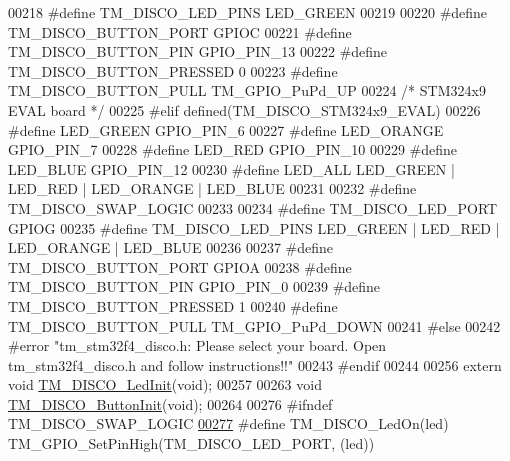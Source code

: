 \begin{DoxyCode}
00218 \textcolor{preprocessor}{    #define TM\_DISCO\_LED\_PINS           LED\_GREEN}
00219 
00220 \textcolor{preprocessor}{    #define TM\_DISCO\_BUTTON\_PORT        GPIOC}
00221 \textcolor{preprocessor}{    #define TM\_DISCO\_BUTTON\_PIN         GPIO\_PIN\_13}
00222 \textcolor{preprocessor}{    #define TM\_DISCO\_BUTTON\_PRESSED     0}
00223 \textcolor{preprocessor}{    #define TM\_DISCO\_BUTTON\_PULL        TM\_GPIO\_PuPd\_UP}
00224 \textcolor{comment}{/* STM324x9 EVAL board */}
00225 \textcolor{preprocessor}{#elif defined(TM\_DISCO\_STM324x9\_EVAL)}
00226 \textcolor{preprocessor}{    #define LED\_GREEN                   GPIO\_PIN\_6}
00227 \textcolor{preprocessor}{    #define LED\_ORANGE                  GPIO\_PIN\_7}
00228 \textcolor{preprocessor}{    #define LED\_RED                     GPIO\_PIN\_10}
00229 \textcolor{preprocessor}{    #define LED\_BLUE                    GPIO\_PIN\_12}
00230 \textcolor{preprocessor}{    #define LED\_ALL                     LED\_GREEN | LED\_RED | LED\_ORANGE | LED\_BLUE}
00231     
00232 \textcolor{preprocessor}{    #define TM\_DISCO\_SWAP\_LOGIC}
00233     
00234 \textcolor{preprocessor}{    #define TM\_DISCO\_LED\_PORT           GPIOG}
00235 \textcolor{preprocessor}{    #define TM\_DISCO\_LED\_PINS           LED\_GREEN | LED\_RED | LED\_ORANGE | LED\_BLUE}
00236 
00237 \textcolor{preprocessor}{    #define TM\_DISCO\_BUTTON\_PORT        GPIOA}
00238 \textcolor{preprocessor}{    #define TM\_DISCO\_BUTTON\_PIN         GPIO\_PIN\_0}
00239 \textcolor{preprocessor}{    #define TM\_DISCO\_BUTTON\_PRESSED     1}
00240 \textcolor{preprocessor}{    #define TM\_DISCO\_BUTTON\_PULL        TM\_GPIO\_PuPd\_DOWN}
00241 \textcolor{preprocessor}{#else}
00242 \textcolor{preprocessor}{    #error "tm\_stm32f4\_disco.h: Please select your board. Open tm\_stm32f4\_disco.h and follow
       instructions!!"}
00243 \textcolor{preprocessor}{#endif}
00244 
00256 \textcolor{keyword}{extern} \textcolor{keywordtype}{void} \hyperlink{group___t_m___d_i_s_c_o___functions_ga14630e30f567396ddc945c577d762ee1}{TM\_DISCO\_LedInit}(\textcolor{keywordtype}{void});
00257 
00263 \textcolor{keywordtype}{void} \hyperlink{group___t_m___d_i_s_c_o___functions_gabe5d286b45c36b96b3eb4df0e5b9cfde}{TM\_DISCO\_ButtonInit}(\textcolor{keywordtype}{void});
00264 
00276 \textcolor{preprocessor}{#ifndef TM\_DISCO\_SWAP\_LOGIC}
\hypertarget{tm__stm32f4__disco_8h_source_l00277}{}\hyperlink{group___t_m___d_i_s_c_o___functions_ga72aa66c1c0647cf3bbb3c2c069f1901a}{00277} \textcolor{preprocessor}{    #define TM\_DISCO\_LedOn(led)         TM\_GPIO\_SetPinHigh(TM\_DISCO\_LED\_PORT, (led))}

\end{DoxyCode}
